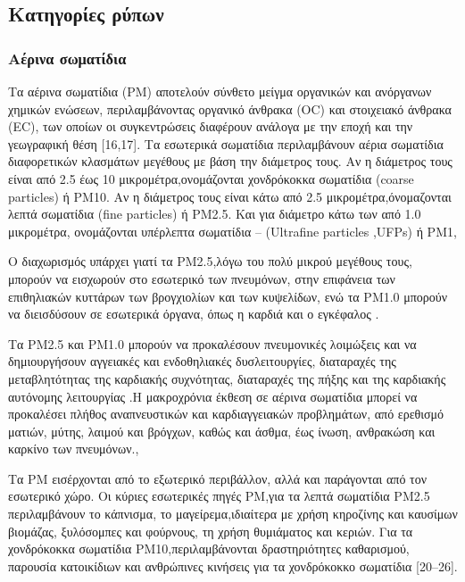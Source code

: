 \subsection{Κατηγορίες ρύπων}


\subsubsection{Αέρινα σωματίδια}



Τα αέρινα σωματίδια (PM) αποτελούν σύνθετο μείγμα οργανικών και ανόργανων χημικών ενώσεων, περιλαμβάνοντας οργανικό άνθρακα (OC) και στοιχειακό άνθρακα (EC), των οποίων οι συγκεντρώσεις διαφέρουν ανάλογα με την εποχή και την γεωγραφική θέση [16,17]. 
Τα εσωτερικά σωματίδια περιλαμβάνουν αέρια σωματίδια διαφορετικών κλασμάτων μεγέθους με βάση  την διάμετρος τους. 
Αν η διάμετρος τους είναι από 2.5 έως 10  μικρομέτρα,ονομάζονται χονδρόκοκκα σωματίδια (coarse particles) ή  PM10.
Αν η διάμετρος τους είναι κάτω από 2.5 μικρομέτρα,όνομαζονται λεπτά σωματίδια (fine particles) ή  PM2.5.
Και για διάμετρο κάτω των από 1.0 μικρομέτρα, ονομάζονται υπέρλεπτα σωματίδια – (Ultrafine particles ,UFPs) ή PM1, 

Ο διαχωρισμός υπάρχει γιατί τα  PM2.5,λόγω του πολύ μικρού μεγέθους τους, μπορούν να  εισχωρούν στο εσωτερικό των πνευμόνων, στην επιφάνεια των επιθηλιακών κυττάρων των βρογχιολίων και των κυψελίδων, ενώ τα PM1.0 μπορούν να διεισδύσουν σε εσωτερικά όργανα, όπως η καρδιά και ο εγκέφαλος \cite{SANGKHAM2024100603}. 

Τα PM2.5 και PM1.0 μπορούν να προκαλέσουν πνευμονικές λοιμώξεις και να δημιουργήσουν αγγειακές και ενδοθηλιακές δυσλειτουργίες, διαταραχές της μεταβλητότητας της καρδιακής συχνότητας, διαταραχές της πήξης και της καρδιακής αυτόνομης λειτουργίας .Η μακροχρόνια έκθεση σε αέρινα σωματίδια μπορεί να προκαλέσει πλήθος αναπνευστικών και καρδιαγγειακών προβλημάτων, από ερεθισμό ματιών, μύτης, λαιμού και βρόγχων, καθώς και άσθμα, έως ίνωση, ανθρακώση και καρκίνο των πνευμόνων.\cite{su12219045},\cite{GONZALEZMARTIN2021128376}

Τα PM εισέρχονται από το εξωτερικό περιβάλλον, αλλά και παράγονται από τον εσωτερικό χώρο. 
Οι κύριες εσωτερικές πηγές PM,για τα λεπτά σωματίδια PM2.5 περιλαμβάνουν το κάπνισμα, το μαγείρεμα,ιδιαίτερα με χρήση κηροζίνης και καυσίμων βιομάζας, ξυλόσομπες και φούρνους, τη χρήση θυμιάματος και κεριών.
Για τα χονδρόκοκκα σωματίδια PM10,περιλαμβάνονται δραστηριότητες καθαρισμού, παρουσία κατοικίδιων και ανθρώπινες κινήσεις για τα χονδρόκοκκο σωματίδια [20–26]\cite{ijerph17238972}.


